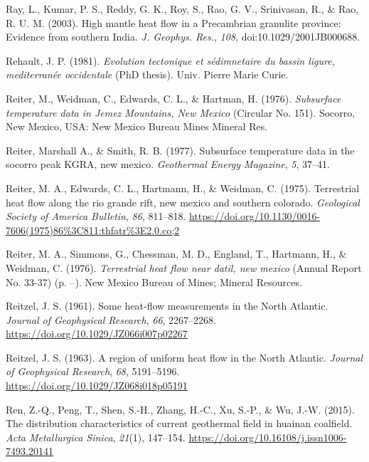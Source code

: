 \documentclass[draft,linenumbers]{agujournal2018}
\begin{document}
\leavevmode{}%
Ray, L., Kumar, P. S., Reddy, G. K., Roy, S., Rao, G. V., Srinivasan,
R., \& Rao, R. U. M. (2003). High mantle heat flow in a {Precambrian}
granulite province: Evidence from southern {India}. \emph{J. Geophys.
Res.}, \emph{108}, doi:10.1029/2001JB000688.

\leavevmode{}%
Rehault, J. P. (1981). \emph{Evolution tectonique et s{é}dimnetaire du
bassin ligure, mediterran{é}e occidentale} (PhD thesis). Univ. Pierre
Marie Curie.

\leavevmode{}%
Reiter, M., Weidman, C., Edwards, C. L., \& Hartman, H. (1976).
\emph{Subsurface temperature data in {Jemez Mountains, New Mexico}}
(Circular No. 151). Socorro, New Mexico, USA: New Mexico Bureau Mines
Mineral Res.

\leavevmode{}%
Reiter, Marshall A., \& Smith, R. B. (1977). Subsurface temperature data
in the socorro peak KGRA, new mexico. \emph{Geothermal Energy Magazine},
\emph{5}, 37--41.

\leavevmode{}%
Reiter, M. A., Edwards, C. L., Hartmann, H., \& Weidman, C. (1975).
Terrestrial heat flow along the rio grande rift, new mexico and southern
colorado. \emph{Geological Society of America Bulletin}, \emph{86},
811--818.
\url{https://doi.org/10.1130/0016-7606(1975)86\%3C811:thfatr\%3E2.0.co;2}

\leavevmode{}%
Reiter, M. A., Simmons, G., Chessman, M. D., England, T., Hartmann, H.,
\& Weidman, C. (1976). \emph{Terrestrial heat flow near datil, new
mexico} (Annual Report No. 33-37) (p. --). New Mexico Bureau of Mines;
Mineral Resources.

\leavevmode{}%
Reitzel, J. S. (1961). Some heat-flow measurements in the {North
Atlantic}. \emph{Journal of Geophysical Research}, \emph{66},
2267--2268. \url{https://doi.org/10.1029/JZ066i007p02267}

\leavevmode{}%
Reitzel, J. S. (1963). A region of uniform heat flow in the {North
Atlantic}. \emph{Journal of Geophysical Research}, \emph{68},
5191--5196. \url{https://doi.org/10.1029/JZ068i018p05191}

\leavevmode{}%
Ren, Z.-Q., Peng, T., Shen, S.-H., Zhang, H.-C., Xu, S.-P., \& Wu, J.-W.
(2015). The distribution characteristics of current geothermal field in
huainan coalfield. \emph{Acta Metallurgica Sinica}, \emph{21}(1),
147--154. \url{https://doi.org/10.16108/j.issn1006-7493.20141}
\end{document}
